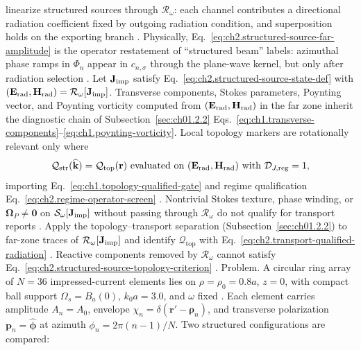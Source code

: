 linearize structured sources through \(\mathcal{R}_\omega\): each channel contributes a
directional radiation coefficient fixed by outgoing radiation condition, and superposition holds on the
exporting branch \cite{stratton1941}. Physically, Eq.~\eqref{eq:ch2.structured-source-far-amplitude}
is the operator restatement of ``structured beam'' labels: azimuthal phase ramps in
\(\Phi_n\) appear in \(c_{n,\sigma}\) through the plane-wave kernel, but only after radiation
selection \cite{allen1992}.
\label{prop:ch2.structured-source-topology-diagnostic}
Let \(\mathbf{J}_{\mathrm{imp}}\) satisfy Eq.~\eqref{eq:ch2.structured-source-state-def} with
\((\mathbf{E}_{\mathrm{rad}},\mathbf{H}_{\mathrm{rad}})=\mathcal{R}_\omega[\mathbf{J}_{\mathrm{imp}}]\). Transverse components,
Stokes parameters, Poynting vector, and Poynting vorticity computed from
\((\mathbf{E}_{\mathrm{rad}},\mathbf{H}_{\mathrm{rad}})\) in the far zone inherit the diagnostic chain of
Subsection~\ref{sec:ch01.2.2} Eqs.~\eqref{eq:ch1.transverse-components}--\eqref{eq:ch1.poynting-vorticity}.
Local topology markers are rotationally relevant only where
\begin{equation}
\label{eq:ch2.structured-source-topology-criterion}
\mathcal{Q}_{\mathrm{str}}(\widehat{\mathbf{k}})
=
\mathcal{Q}_{\mathrm{top}}(\mathbf{r})
\ \text{evaluated on}\ (\E_{\mathrm{rad}},\H_{\mathrm{rad}})\ \text{with}\ 
\mathcal{D}_{J,\mathrm{reg}}=1,
\end{equation}
importing Eq.~\eqref{eq:ch1.topology-qualified-gate} and regime qualification
Eq.~\eqref{eq:ch2.regime-operator-screen} \cite{stratton1941}. Nontrivial
Stokes texture, phase winding, or \(\boldsymbol{\Omega}_P\neq\mathbf{0}\) on
\(\mathcal{S}_\omega[\mathbf{J}_{\mathrm{imp}}]\) without passing through \(\mathcal{R}_\omega\) do not qualify
for transport reports \cite{stratton1941}.
Apply the topology--transport separation (Subsection~\ref{sec:ch01.2.2}) to far-zone traces of
\(\mathcal{R}_\omega[\mathbf{J}_{\mathrm{imp}}]\) and identify \(\mathcal{Q}_{\mathrm{top}}\) with
Eq.~\eqref{eq:ch2.transport-qualified-radiation} \cite{stratton1941}. Reactive
components removed by \(\mathcal{R}_\omega\) cannot satisfy
Eq.~\eqref{eq:ch2.structured-source-topology-criterion} \cite{harrington2001}.
Problem. A circular ring array of \(N=36\) impressed-current elements lies on
\(\rho=\rho_0=0.8a\), \(z=0\), with compact ball support \(\Omega_s=B_a(0)\), \(k_0 a=3.0\),
and \(\omega\) fixed . Each element carries amplitude
\(A_n=A_0\), envelope \(\chi_n=\delta(\mathbf{r}'-\boldsymbol{\rho}_n)\), and transverse
polarization \(\mathbf{p}_n=\hat{\boldsymbol{\phi}}\) at azimuth \(\phi_n=2\pi(n-1)/N\).
Two structured configurations are compared:
